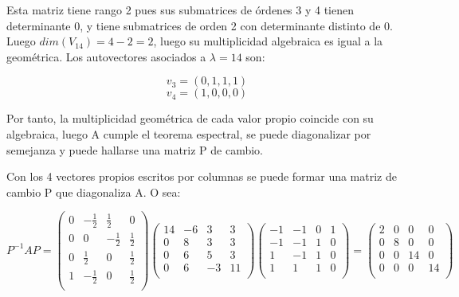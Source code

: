 \documentclass[11pt, a4paper]{article}
\newif\IfInSansMode
\theoremstyle{theorem-style}
\theoremstyle{definition-style}
\theoremstyle{remark-style}
\theoremstyle{example-style}
\begin{document}
Esta matriz tiene rango 2 pues sus submatrices de órdenes 3 y 4 tienen determinante 0, y tiene submatrices de orden 2 con determinante distinto de 0. Luego $dim(V_{14})=4-2=2$, luego su multiplicidad algebraica es igual a la geométrica. Los autovectores asociados a $\lambda=14$ son:

$$v_3=(0,1,1,1)$$ $$v_4=(1,0,0,0)$$ 

Por tanto, la multiplicidad geométrica de cada valor propio coincide con su algebraica, luego A cumple el teorema espectral, se puede diagonalizar por semejanza y puede hallarse una matriz P de cambio.

Con los 4 vectores propios escritos por columnas se puede formar una matriz de cambio P que diagonaliza A. O sea:

$$P^{-1}AP = \begin{pmatrix}
0 & -\frac{1}{2} & \frac{1}{2} & 0\\
0 & 0 & -\frac{1}{2} & \frac{1}{2}\\
0 & \frac{1}{2} & 0 & \frac{1}{2}\\
1 & -\frac{1}{2} & 0 & \frac{1}{2} \\ 
\end{pmatrix}\begin{pmatrix}
14 & -6 & 3 & 3\\
0 & 8 & 3 & 3\\
0 & 6 & 5 & 3\\
0 & 6 & -3 & 11 \\
\end{pmatrix}\begin{pmatrix}
-1 & -1 & 0 & 1\\
-1 & -1 & 1 & 0\\
1 & -1 & 1 & 0\\
1 & 1 & 1 & 0 \\ 
\end{pmatrix}=\begin{pmatrix}
2 & 0 & 0 & 0\\
0 & 8 & 0 & 0\\
0 & 0 & 14 & 0\\
0 & 0 & 0 & 14 \\
\end{pmatrix}
$$




\end{document}
